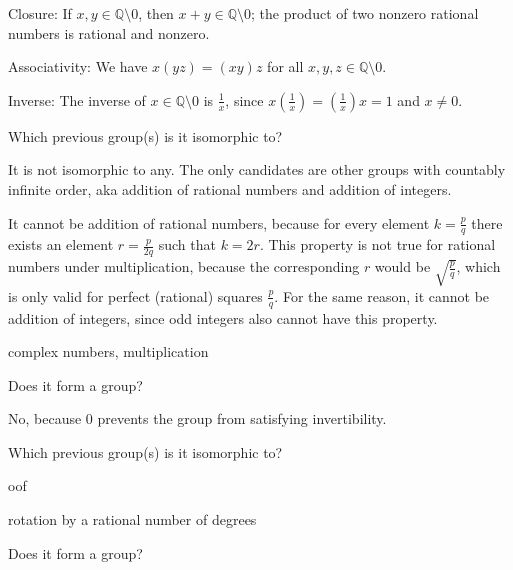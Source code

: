 \documentclass[../gatm_answers.tex]{subfiles}
\begin{document}
Closure: If $x,y\in \mathbb{Q} \setminus {0}$, then $x+y\in \mathbb{Q} \setminus {0}$; the product of two nonzero rational numbers is rational and nonzero.

Associativity: We have $x(yz)=(xy)z$ for all $x,y,z \in \mathbb{Q} \setminus {0}$.

Inverse: The inverse of $x\in \mathbb{Q} \setminus {0}$ is $\frac{1}{x}$, since $x\left(\frac{1}{x}\right)=\left(\frac{1}{x}\right)x=1$ and $x\neq 0$.

\begin{iinner_problem}
\item Which previous group(s) is it isomorphic to?
\end{iinner_problem}

It is not isomorphic to any. The only candidates are other groups with countably infinite order, aka addition of rational numbers and addition of integers.

It cannot be addition of rational numbers, because for every element $k=\frac{p}{q}$ there exists an element $r=\frac{p}{2q}$ such that $k=2r$. This property is not true for rational numbers under multiplication, because the corresponding $r$ would be $\sqrt{\frac{p}{q}}$, which is only valid for perfect (rational) squares $\frac{p}{q}$. For the same reason, it cannot be addition of integers, since odd integers also cannot have this property.

\begin{inner_problem}
\item complex numbers, multiplication
\end{inner_problem}

\begin{iinner_problem}[start=1]
\item Does it form a group?
\end{iinner_problem}

No, because $0$ prevents the group from satisfying invertibility.

\begin{iinner_problem}
\item Which previous group(s) is it isomorphic to?
\end{iinner_problem}

oof

\begin{inner_problem}
\item rotation by a rational number of degrees
\end{inner_problem}

\begin{iinner_problem}[start=1]
\item Does it form a group?
\end{iinner_problem}
\end{document}
